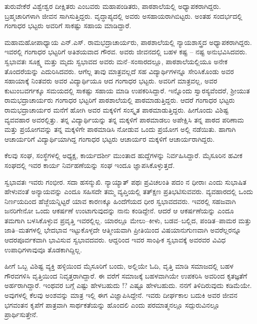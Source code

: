{ತುರುವೇಕೆರೆ ವಿಶ್ವೇಶ್ವರ ದೀಕ್ಷಿತರು ಎಂಬವರು ಮಹಾಪಂಡಿತರು, ಪಾಠಶಾಲೆಯಲ್ಲಿ ಅಧ್ಯಾಪಕರಾಗಿದ್ದರು. ಬ್ರಹ್ಮಚಾರಿಗಳಾಗಿ ಜೀವನ ಸಾಗಿಸುತ್ತಿದ್ದರು. ವೃದ್ಧಾಪ್ಯದಲ್ಲಿ ಅವರು ಅಸಹಾಯರಾಗಿಬಿಟ್ಟರು. ಅಂತಹ ಸಂದರ್ಭದಲ್ಲಿ ಗಂಗಾಧರ ಭಟ್ಟರು ಅವರಿಗೆ ಸಾಕಷ್ಟು ಸಹಾಯ ಮಾಡಿದ್ದಾರೆ. 

ಮಹಾಮಹೋಪಾಧ್ಯಾಯ ಎನ್.ಎಸ್. ರಾಮಭದ್ರಾಚಾರ್ಯರು, ಪಾಠಶಾಲೆಯಲ್ಲಿ ನ್ಯಾಯಶಾಸ್ತ್ರದ ಅಧ್ಯಾಪಕರಾಗಿದ್ದರು. ಇವರಲ್ಲಿ ಗಂಗಾಧರ ಭಟ್ಟರಿಗೆ ಅತಿಶಯವಾದ ಗೌರವ. ಅವರು ಜೀವನದಲ್ಲಿ ಬಹಳ ಕಷ್ಟ – ನಷ್ಟ ಅನುಭವಿಸಿದವರು. ಸ್ವಭಾವತಃ ಸೂಕ್ಷ್ಮ ಮತ್ತು ಮೃದು ಸ್ವಭಾವದ ಅವರು ಮನೆ–ಸಂಸಾರದಲ್ಲೂ, ಪಾಠಶಾಲೆಯಲ್ಲಿಯೂ ಅನೇಕ ತೊಂದರೆಯನ್ನು ಎದುರಿಸಿದವರು. ಆಗೆಲ್ಲ ತಾವು ಮಾತ್ರವಲ್ಲದೆ ಸಹ ವಿದ್ಯಾರ್ಥಿಗಳನ್ನೂ ಸೇರಿಸಿಕೊಂಡು ಅವರ ಸಹಾಯಾಕ್ಕೆ ನಿಂತವರು ಅವರ ವಿದ್ಯಾರ್ಥಿಯೂ ಆದ ಗಂಗಾಧರ ಭಟ್ಟರು. ಅವರಿಗೆ ಮಾತ್ರವಲ್ಲ, ಅವರ  ಕುಟುಂಬವರ್ಗಕ್ಕೂ ಸಮಯದಲ್ಲಿ ಸಾಕಷ್ಟು ಸಹಾಯ ಮಾಡಿ ಉಪಕರಿಸಿದ್ದಾರೆ. ಇನ್ನೊಂದು ಸ್ವಾರಸ್ಯವೆಂದರೆ, ಶ್ರೀಯುತ ರಾಮಭದ್ರಾಚಾರ್ಯರು ಗಂಗಾಧರ ಭಟ್ಟರಿಗೆ ಪಾಠಶಾಲೆಯಲ್ಲಿ ಪಾಠಮಾಡುತ್ತಿದ್ದರು. ಆದರೆ ಗಂಗಾಧರ ಭಟ್ಟರು ರಾಮಭದ್ರಾಚಾರ್ಯರ  ಮನೆಗೆ ಹೋಗಿ ಅವರ ಮಕ್ಕಳಿಗೆ ಸಂಸ್ಕೃತ ಪಾಠಮಾಡುತ್ತಿದ್ದರು. ಹೀಗೊಂದು ವಿಶಿಷ್ಟ ವ್ಯವವಹಾರ ಅವರಲ್ಲಿತ್ತು. ತನ್ನ ವಿದ್ಯಾರ್ಥಿಯನ್ನು ತನ್ನ ಮಕ್ಕಳಿಗೆ ಪಾಠಮಾಡಲು ಅಪೇಕ್ಷಿಸಿ ತನ್ನ ಪಾಠದ ಪರಿಣಾಮ ಮತ್ತು ಪ್ರಯೋಗವನ್ನು ತನ್ನ ಮಕ್ಕಳಿಗೇ ಪಾಠಮಾಡಿಸಿ ನೋಡುವ ಒಂದು ಪ್ರಯೋಗ ಅಲ್ಲಿ ನಡೆಯಿತು.  ಹಾಗಾಗಿ ಆಚಾರ್ಯರಿಗೆ ವಿದ್ಯಾರ್ಥಿಯಾಗಿದ್ದ ಗಂಗಾಧರ ಭಟ್ಟರು  ಆಚಾರ್ಯರ ಮಕ್ಕಳಿಗೆ ಆಚಾರ್ಯರಾಗಿದ್ದರು.

ಕೆಲವು ಸಂಘ, ಸಂಸ್ಥೆಗಳಲ್ಲಿ ಅಧ್ಯಕ್ಷ, ಕಾರ್ಯದರ್ಶೀ ಮುಂತಾದ ಹುದ್ದೆಗಳನ್ನು ನಿರ್ವಹಿಸಿದ್ದಾರೆ. ಮೈಸೂರಿನ ಹವೀಕ ಸಂಘದಲ್ಲಿ ಇವರ ಕಾರ್ಯ ನಿರ್ವಹಣೆಯನ್ನು ಸಂಘ ಇಂದೂ ಜ್ಞಾಪಸಿಕೊಳ್ಳುತ್ತದೆ. 

ಸ್ವಭಾವತಃ ಇವರು ಗಂಭೀರ. ಸದಾ ಹಸನ್ಮುಖಿ. ನ್ಯಾಯ್ಯಾತ್ ಪಥಃ ಪ್ರವಿಚಲಂತಿ ಪದಂ ನ ಧೀರಾಃ ಎಂದು ಸುಭಾಷಿತ ಹೇಳುವಂತೆ ಅನ್ಯಾಯವನ್ನು ಎಂದೂ ಸಹಿಸದೇ ತಮ್ಮ ವ್ಯಪ್ತಿಯಲ್ಲಿ ತತ್ಕ್ಷಣ ಪ್ರತಿಭಟಿಸುವವರು. ವ್ಯವಹಾರದಲ್ಲಿ ಒಂದು  ನಿರ್ಣಯದಿಂದ ಹೆಜ್ಜೆಯನ್ನಿಟ್ಟರೆ ಯಾವ ಕಾರಣಕ್ಕೂ ಹಿಂದೆಗೆಯದ ಧೀರ ಸ್ವಭಾವದವರು. ಇವರಲ್ಲಿ ಸಹಜವಾಗಿ ಜನರಿಗೇನೋ ಒಂದು ಆಕರ್ಷಣೆ ಉಂಟಾಗುವುದನ್ನು ನಾನು ಕಂಡಿದ್ದೇನೆ. ಆದರೆ ಆ ಆಕರ್ಷಣೆಯನ್ನು ಎಂದೂ ತಮಗಾಗಿ ಬಳಸಿಕೊಳ್ಳುವ ಪ್ರವೃತ್ತಿ ಇವರಲ್ಲಿಲ್ಲ.  ಯಾರಲ್ಲೂ ಮೇಲು–ಕೀಳು, ಬಡವ–ಬಲ್ಲಿದ, ಪಂಡಿತ–ಪಾಮರ ಮತ್ತು ಜಾತಿ–ಮತಗಳಲ್ಲಿ ಭೇದಭಾವ ಇಟ್ಟುಕೊಳ್ಳದೇ ಆತ್ಮೀಯವಾಗಿ ಪ್ರೀತಿಯಿಂದ ವಿಷಯಾನುಗುಣವಾಗಿ ಅವರೆಲ್ಲರನ್ನೂ ಆದರಪೂರ್ವಕವಾಗಿ ಭಾವಿಸುವ ಸ್ವಭಾವದವರು. ಆದ್ದರಿಂದ ಇವರ ಸಾಂಘಿಕ ಸ್ವಭಾವಕ್ಕೆ ಅವರವರ ವಿವಿಧ ಉಪಾಧಿಗಳಾವುವೂ  ತೊಡಕಾಗಿದ್ದಿಲ್ಲ.

ಹೀಗೆ ಒಬ್ಬ ವಿಶಿಷ್ಟ ವ್ಯಕ್ತಿ ಹಳ್ಳಿಯಿಂದ ಮೈಸೂರಿಗೆ ಬಂದು, ಅಲ್ಲಿಯೇ ಓದಿ, ವೃತ್ತಿ ಮಾಡಿ ಸಮಾಜದಲ್ಲಿ ಬಹಳ ಗೌರವಗಳಿಸಿ ವೃತ್ತಿಯಿಂದ ನಿವೃತ್ತರಾಗಿದ್ದಾರೆ. ಈ ವರೆಗೆ ಸಮಾಜಕ್ಕೆ ಬಹಳವಾಗಿಯೇ ಉಪಕರಿಸಿ ಅವರಿಂದ ಕೃತಜ್ಞತೆಗೆ ಅರ್ಹರಾಗಿದ್ದಾರೆ. ಇಂಥವರ ಬಗ್ಗೆ ಎಷ್ಟು ಹೇಳಬಹುದು !? ಎಷ್ಟೂ ಹೇಳಬಹುದು. ನನಗೆ ತಿಳಿದಿರುವುದು ಕಡಿಮೆಯೇ. ಅವುಗಳಲ್ಲಿ ಕೆಲವು ಅಂಶವನ್ನು ಮಾತ್ರ ಇಲ್ಲಿ ಈಗ ವಿಜ್ಞಾಪಿಸಿದ್ದೇನೆ. ಇವರು ದೀರ್ಘಕಾಲ ಬದುಕಿ ಅವರ ಜೀವನ ಭಗವಂತನ ಕೃಪೆಗೆ ಪಾತ್ರವಾಗಿ ಸಾರ್ಥಕತೆಯನ್ನು ಹೊಂದಲಿ ಎಂದು ಪರಮಾತ್ಮನಲ್ಲೂ ಸದ್ಗುರುವಿನಲ್ಲೂ ಪ್ರಾರ್ಥಿಸುತ್ತೇನೆ.

\articleend
}
